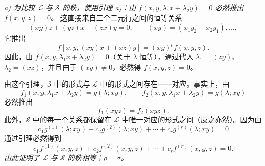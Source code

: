 \emph{a) 为比较 $\mathcal L$ 与 $\mathcal S$ 的秩，使用引理 a)：由 $f(x,y,\lambda_1x+\lambda_2y)=0$ 必然推出 $f(x,y,z)=0$。} 这直接来自三个二元行之间的恒等关系
\[
  (xy)z+(yz)x+(zx)y=0,
  \qquad (xy)=(x_1y_2-x_2y_1),\ldots,
\]
它推出
\[
  f[x,y,(xy)x+(xz)y]=(xy)^p f(x,y,z).
\]
因此，由 $f(x,y,\lambda_1x+\lambda_2y)=0$（关于 $\lambda$ 恒等），通过代入 $\lambda_1=(zy)$、$\lambda_2=(xz)$，并且由于 $(xy)\ne0$，必然得 $f(x,y,z)=0$。

由这个引理，$\mathcal S$ 中的形式与 $\mathcal L$ 中的形式之间存在一一对应。事实上，由
\[
  f_1(x,y,\lambda_1x+\lambda_2y)=g(\lambda;xy),\qquad
  f_2(x,y,\lambda_1x+\lambda_2y)=g(\lambda;xy)
\]
必然推出
\[
  f_1(xyz)=f_2(xyz).
\]
此外，$\mathcal S$ 中的每一个关系都保留在 $\mathcal L$ 中唯一对应的形式之间（反之亦然）。因为由
\[
  c_1g^{(1)}(\lambda;xy)+c_2g^{(2)}(\lambda;xy)+\cdots+c_rg^{(r)}(\lambda;xy)=0
\]
通过引理必然得到
\[
  c_1f^{(1)}(x,y,z)+c_2f^{(2)}(x,y,z)+\cdots+c_rf^{(r)}(x,y,z)=0.
\]
\emph{由此证明了 $\mathcal L$ 与 $\mathcal S$ 的秩相等；$\rho=\sigma$。}


